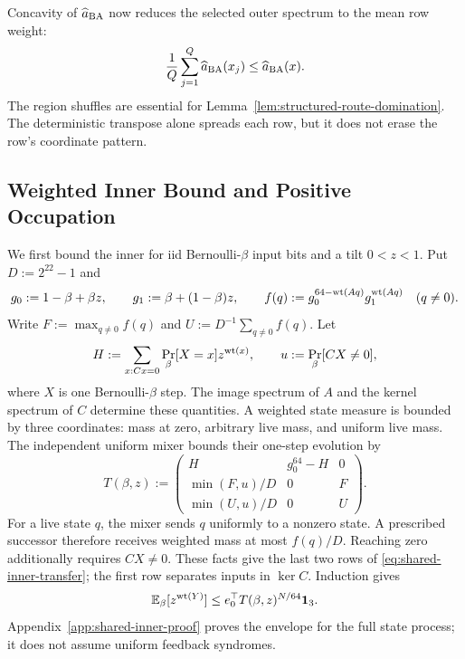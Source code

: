 Concavity of $\widehat a_{\rm BA}$ now reduces the selected outer spectrum
to the mean row weight:
\begin{equation}
  \frac1Q\sum_{j=1}^Q\widehat a_{\rm BA}(x_j)
  \le
  \widehat a_{\rm BA}(x).
  \label{eq:structured-ba-jensen}
\end{equation}
The region shuffles are essential for Lemma~\ref{lem:structured-route-domination}.
The deterministic transpose alone spreads each row, but it does not erase
the row's coordinate pattern.

\subsection{Weighted Inner Bound and Positive Occupation}

We first bound the inner for iid Bernoulli-$\beta$ input bits and a tilt
$0<z<1$. Put $D:=2^{22}-1$ and
\[
 g_0:=1-\beta+\beta z,\qquad g_1:=\beta+(1-\beta)z,
 \qquad f(q):=g_0^{64-\operatorname{wt}(Aq)}g_1^{\operatorname{wt}(Aq)}\quad(q\ne0).
\]
Write $F:=\max_{q\ne0}f(q)$ and
$U:=D^{-1}\sum_{q\ne0}f(q)$. Let
\[
 H:=\sum_{x:Cx=0}\Pr_\beta[X=x]z^{\operatorname{wt}(x)},
 \qquad u:=\Pr_\beta[CX\ne0],
\]
where $X$ is one Bernoulli-$\beta$ step. The image spectrum of $A$
and the kernel spectrum of $C$ determine these quantities.
A weighted state measure is bounded by three coordinates: mass at zero,
arbitrary live mass, and uniform live mass. The independent uniform
mixer bounds their one-step evolution by
\begin{equation}
 T(\beta,z):=
 \begin{pmatrix}
 H&g_0^{64}-H&0\\
 \min(F,u)/D&0&F\\
 \min(U,u)/D&0&U
 \end{pmatrix}.
 \label{eq:shared-inner-transfer}
\end{equation}
For a live state $q$, the mixer sends $q$ uniformly to a nonzero state.
A prescribed successor therefore receives weighted mass at most
$f(q)/D$. Reaching zero additionally requires $CX\ne0$. These facts
give the last two rows of \eqref{eq:shared-inner-transfer}; the first
row separates inputs in $\ker C$. Induction gives
\[
 \mathbb E_\beta[z^{\operatorname{wt}(Y)}]\le e_0^\top T(\beta,z)^{N/64}\mathbf 1_3.
\]
Appendix~\ref{app:shared-inner-proof} proves the envelope for the
full state process; it does not assume uniform feedback syndromes.

